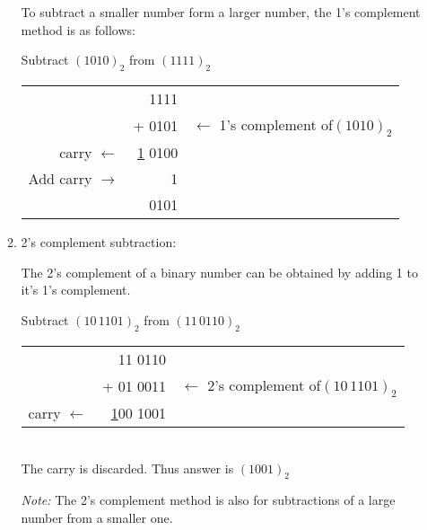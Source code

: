\documentclass[../main-sheet.tex]{subfiles}
\begin{document}
\begin{enumerate}
\begin{enumerate}[label=(\roman*)]
                    To subtract a smaller number form a larger number, the 1's complement method is as follows:
                    \begin{ex}
                        Subtract \((1010)_2\) from \((1111)_2\)\\
                        \begin{tabular}{rrr}
                                                 & 1111               &                                              \\
                                                 & + 0101             & \(\leftarrow\) 1's complement of\((1010)_2\) \\\cline{2-2}
                            carry \(\leftarrow\) & \underline{1} 0100 &                                              \\
                            Add carry \(\to\)    & 1                  &                                              \\\cline{2-2}
                                                 & 0101               &                                              \\
                        \end{tabular}
                    \end{ex}
              \item 2's complement subtraction:

                    The 2's complement of a binary number can be obtained by adding 1 to it's 1's complement.
                    \begin{ex}
                        Subtract \((10\,1101)_2\) from \((11\,0110)_2\)\\
                        \begin{tabular}{rrr}
                                                 & 11 0110              &                                                  \\
                                                 & + 01 0011            & \(\leftarrow\) 2's complement of\((10\,1101)_2\) \\\cline{2-2}
                            carry \(\leftarrow\) & \underline{1}00 1001 &                                                  \\
                        \end{tabular}\\
                        The carry is discarded. Thus answer is \((1001)_2\)
                    \end{ex}
                    \emph{Note:} The 2's complement method is also for subtractions of a large number from a smaller one.
          \end{enumerate}
\end{enumerate}
\end{document}
